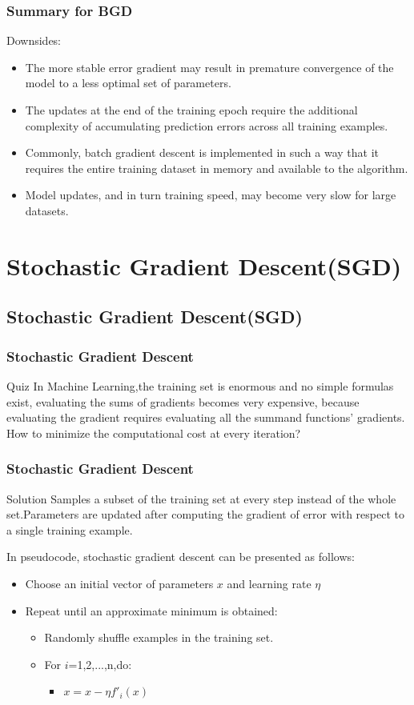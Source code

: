 \documentclass[cjk]{beamer}
\begin{document}
\begin{frame}
\frametitle{Summary for BGD}
Downsides:
	\begin{itemize}
	\item The more stable error gradient may result in premature convergence of the model to a less optimal set of parameters.
	\item The updates at the end of the training epoch require the additional complexity of accumulating prediction errors across all training examples.
	\item Commonly, batch gradient descent is implemented in such a way that it requires the entire training dataset in memory and available to the algorithm.
	\item Model updates, and in turn training speed, may become very slow for large datasets.
	\end{itemize}
\end{frame}

\section{Stochastic Gradient Descent(SGD)}
\subsection{Stochastic Gradient Descent(SGD)}

\begin{frame}
\frametitle{Stochastic Gradient Descent}
	\begin{block}{Quiz}
	In Machine Learning,the training set is enormous and no simple formulas exist, evaluating the sums of 		gradients becomes very expensive, because evaluating the gradient requires evaluating all the summand functions' 	gradients.
	How to minimize the computational cost at every iteration? 
	\end{block}
\end{frame}

\begin{frame}
\frametitle{Stochastic Gradient Descent}
\begin{block}{Solution}
Samples a subset of the training set at every step instead of the whole set.Parameters are updated after computing the gradient of error with respect to a single training example.
\end{block}
In pseudocode, stochastic gradient descent can be presented as follows:\\
\begin{itemize}
\item Choose an initial vector of parameters $x$ and learning rate $\eta$
\item Repeat until an approximate minimum is obtained:
\begin{itemize}
\item Randomly shuffle examples in the training set.
\item For $i$=1,2,...,n,do:
\begin{itemize}
\item $x=x-\eta f'_i(x)$
\end{itemize}
\end{itemize}
\end{itemize}
\end{frame}
\end{document}
